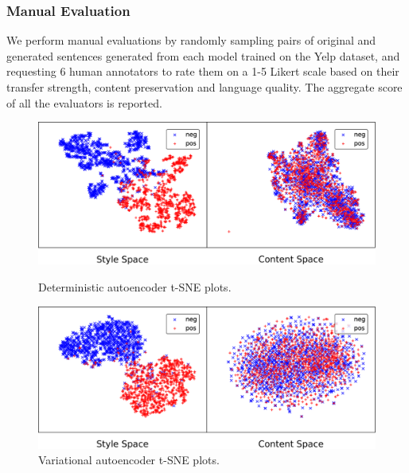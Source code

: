 \documentclass[letterpaper]{article} %
\begin{document}
\subsubsection{Manual Evaluation}
We perform manual evaluations by randomly sampling pairs of original and generated sentences generated from each model trained on the Yelp dataset, and requesting 6 human annotators to rate them on a 1-5 Likert scale \cite{stent2005evaluating} based on their transfer strength, content preservation and language quality.
The aggregate score of all the evaluators is reported.

\begin{figure}[ht]
	\captionsetup{justification=centering}

	\includegraphics[width=\linewidth]{dae-latent-spaces}
	\caption{Deterministic autoencoder t-SNE plots.}
	\label{fig:dae-tsne}

	\includegraphics[width=\linewidth]{vae-latent-spaces}
	\caption{Variational autoencoder t-SNE plots.}
	\label{fig:vae-tsne}
\end{figure}
\end{document}
